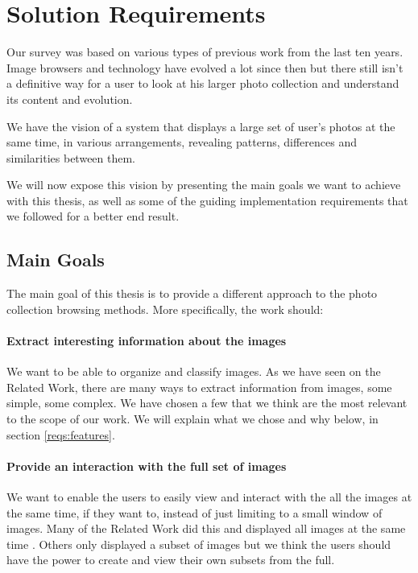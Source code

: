 \chapter{Solution Requirements} %
\label{chapter:solution_requirements}

Our survey was based on various types of previous work from the last ten years. Image browsers and technology have evolved a lot since then but there still isn't a definitive way for a user to look at his larger photo collection and understand its content and evolution.



We have the vision of a system that displays a large set of user’s photos at the same time, in various arrangements, revealing patterns, differences and similarities between them.

We will now expose this vision by presenting the main goals we want to achieve with this thesis, as well as some of the guiding implementation requirements that we followed for a better end result.





\section{Main Goals} %
\label{reqs:main_goal}

The main goal of this thesis is to provide a different approach to the photo collection browsing methods. More specifically, the work should:


\subsubsection{Extract interesting information about the images}
We want to be able to organize and classify images. As we have seen on the Related Work, there are many ways to extract information from images, some simple, some complex. We have chosen a few that we think are the most relevant to the scope of our work. We will explain what we chose and why below, in section \ref{reqs:features}.


\subsubsection{Provide an interaction with the full set of images}
We want to enable the users to easily view and interact with the all the images at the same time, if they want to, instead of just limiting to a small window of images. Many of the Related Work did this and displayed all images at the same time \cite{Qiu:2007p1207,Chen:1998p2344,Girgensohn:2009:MOP:1502650.1502711,Bederson:2001:PZI:502348.502359}. Others only displayed a subset of images but we think the users should have the power to create and view their own subsets from the full.


